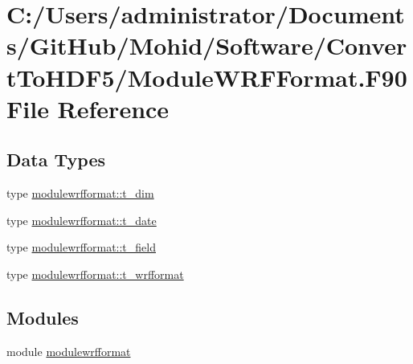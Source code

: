 \hypertarget{_module_w_r_f_format_8_f90}{}\section{C\+:/\+Users/administrator/\+Documents/\+Git\+Hub/\+Mohid/\+Software/\+Convert\+To\+H\+D\+F5/\+Module\+W\+R\+F\+Format.F90 File Reference}
\label{_module_w_r_f_format_8_f90}
\subsection*{Data Types}
\begin{DoxyCompactItemize}
\item 
type \mbox{\hyperlink{structmodulewrfformat_1_1t__dim}{modulewrfformat\+::t\+\_\+dim}}
\item 
type \mbox{\hyperlink{structmodulewrfformat_1_1t__date}{modulewrfformat\+::t\+\_\+date}}
\item 
type \mbox{\hyperlink{structmodulewrfformat_1_1t__field}{modulewrfformat\+::t\+\_\+field}}
\item 
type \mbox{\hyperlink{structmodulewrfformat_1_1t__wrfformat}{modulewrfformat\+::t\+\_\+wrfformat}}
\end{DoxyCompactItemize}
\subsection*{Modules}
\begin{DoxyCompactItemize}
\item 
module \mbox{\hyperlink{namespacemodulewrfformat}{modulewrfformat}}
\end{DoxyCompactItemize}
